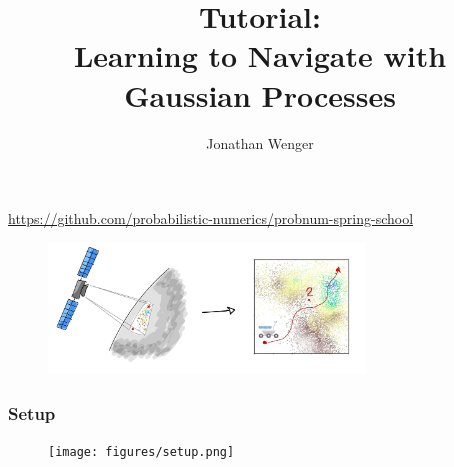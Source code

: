 \documentclass[10pt,usepdftitle=false,aspectratio=169]{beamer}
\begin{document}
\tikzexternaldisable
\begin{frame}
	\title{\huge
		{\bf Tutorial:\\ Learning to Navigate with Gaussian Processes}\vspace{-0.25em}}
		\author{\large Jonathan Wenger}
		
	\date{}

	\maketitle

	\vspace{-4em}

	\centerline{
		\url{https://github.com/probabilistic-numerics/probnum-spring-school}
	}

	\begin{figure}
		\centering
		\includegraphics[width=0.75\textwidth]{../img/learning_to_plan_illustration.jpg}
	\end{figure}

	\thispagestyle{empty}
	\setcounter{framenumber}{0}


\end{frame}

\begin{frame}
	\frametitle{Setup}

	\begin{figure}
		\centering
		\texttt{[image: figures/setup.png]}
	\end{figure}

\end{frame}
\end{document}
